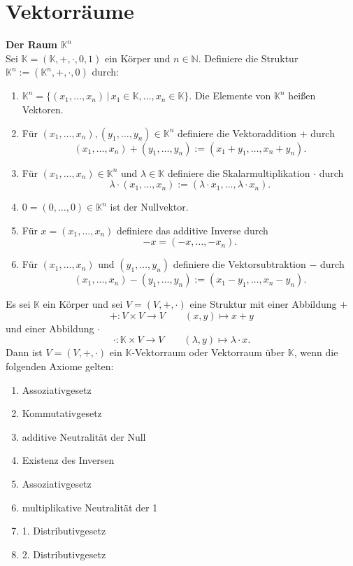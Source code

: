 \documentclass[a4paper,12pt]{article}
\numberwithin{equation}{section}
\begin{document}
\section{Vektorräume}
\textbf{Der Raum $\mathbb{K}^{n}$}\\
Sei $\mathbb{K}=\left(\mathbb{K},+,\cdot ,0,1\right)$ ein Körper und $n  \in \mathbb{N}$. Definiere die Struktur $\mathbb{K}^{n}:=\left(\mathbb{K}^{n},+,\cdot ,0\right)$ durch:
\begin{enumerate}[label=(\alph*)]
        \item $\mathbb{K}^{n}=\{\left(x_1,\hdots ,x_n\right)\,|\, x_1 \in \mathbb{K},\hdots ,x_ n  \in \mathbb{K}\}$. Die Elemente von $\mathbb{K}^{n}$ heißen Vektoren.
        \item Für $\left(x_1,\hdots ,x_n\right),\left(y_1,\hdots ,y_n\right) \in \mathbb{K}^{n}$ definiere die Vektoraddition $+$ durch
                \[ 
                        \left(x_1,\hdots ,x_n\right)+\left(y_1,\hdots ,y_n\right):=\left(x_1+y_1,\hdots ,x_n+y_n\right)
                .\] 
        \item Für $\left(x_1,\hdots ,x_n\right) \in \mathbb{K}^{n}$ und $\lambda  \in \mathbb{K}$ definiere die Skalarmultiplikation $\cdot $ durch
                \[ 
                        \lambda \cdot \left(x_1,\hdots ,x_n\right):=\left(\lambda \cdot x_1,\hdots ,\lambda \cdot x_n\right)
                .\] 
        \item $0=\left(0,\hdots ,0\right) \in \mathbb{K}^{n}$ ist der Nullvektor.
        \item Für $x=\left(x_1,\hdots ,x_n\right)$ definiere das additive Inverse durch
                \[ 
                        -x=\left(-x,\hdots ,-x_n\right)
                .\] 
        \item Für $\left(x_1,\hdots ,x_n\right)$ und $\left(y_1,\hdots ,y_n\right)$ definiere die Vektorsubtraktion $-$ durch
                \[ 
                        \left(x_1,\hdots ,x_n\right)-\left(y_1,\hdots ,y_n\right):=\left(x_1-y_1,\hdots ,x_n-y_n\right)
                .\] 
\end{enumerate}
Es sei $\mathbb{K}$ ein Körper und sei $V=\left(V,+,\cdot \right)$ eine Struktur mit einer Abbildung $+$ 
\[ 
        +:V\times V\rightarrow V\qquad \left(x,y\right)\mapsto x+y
\] 
und einer Abbildung $\cdot $ 
\[ 
        \cdot :\mathbb{K}\times V\rightarrow V\qquad \left(\lambda ,y\right)\mapsto\lambda \cdot x
.\] 
Dann ist $V=\left(V,+,\cdot \right)$ ein $\mathbb{K}$-Vektorraum oder Vektorraum über $\mathbb{K}$, wenn die folgenden Axiome gelten:
\begin{enumerate}[label=(\alph*)]
        \item Assoziativgesetz
        \item Kommutativgesetz
        \item additive Neutralität der Null 
        \item Existenz des Inversen
        \item Assoziativgesetz
        \item multiplikative Neutralität der 1
        \item 1. Distributivgesetz
        \item 2. Distributivgesetz
\end{enumerate}
\end{document}
